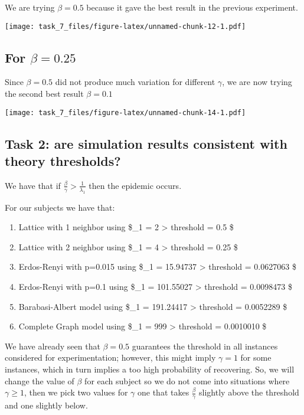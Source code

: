 \documentclass[]{article}
\providecommand{\tightlist}{%
  \setlength{\itemsep}{0pt}\setlength{\parskip}{0pt}}
\begin{document}
We are trying \(\beta = 0.5\) because it gave the best result in the
previous experiment.

\texttt{[image: task\_7\_files/figure-latex/unnamed-chunk-12-1.pdf]}

\subsection{\texorpdfstring{For
\(\beta = 0.25\)}{For \textbackslash{}beta = 0.25}}\label{for-beta-0.25}

Since \(\beta = 0.5\) did not produce much variation for different
\(\gamma\), we are now trying the second best result \(\beta = 0.1\)

\texttt{[image: task\_7\_files/figure-latex/unnamed-chunk-14-1.pdf]}

\subsection{Task 2: are simulation results consistent with theory
thresholds?}\label{task-2-are-simulation-results-consistent-with-theory-thresholds}

We have that if \(\frac{\beta}{\gamma} > \frac{1}{\lambda_1}\) then the
epidemic occurs.

For our subjects we have that:

\begin{enumerate}
\def\labelenumi{\arabic{enumi}.}
\tightlist
\item
  Lattice with 1 neighbor using \$\lambda\_1 = 2
  \implies \frac{\beta}{\gamma} \textgreater{} threshold = 0.5 \$
\item
  Lattice with 2 neighbor using \$\lambda\_1 = 4
  \implies \frac{\beta}{\gamma} \textgreater{} threshold = 0.25 \$
\item
  Erdos-Renyi with p=0.015 using \$\lambda\_1 = 15.94737
  \implies \frac{\beta}{\gamma} \textgreater{} threshold = 0.0627063 \$
\item
  Erdos-Renyi with p=0.1 using \$\lambda\_1 = 101.55027
  \implies \frac{\beta}{\gamma} \textgreater{} threshold = 0.0098473 \$
\item
  Barabasi-Albert model using \$\lambda\_1 = 191.24417
  \implies \frac{\beta}{\gamma} \textgreater{} threshold = 0.0052289 \$
\item
  Complete Graph model using \$\lambda\_1 = 999
  \implies \frac{\beta}{\gamma} \textgreater{} threshold = 0.0010010 \$
\end{enumerate}

We have already seen that \(\beta = 0.5\) guarantees the threshold in
all instances considered for experimentation; however, this might imply
\(\gamma = 1\) for some instances, which in turn implies a too high
probability of recovering. So, we will change the value of \(\beta\) for
each subject so we do not come into situations where \(\gamma \geq 1\),
then we pick two values for \(\gamma\) one that takes
\(\frac{\beta}{\gamma}\) slightly above the threshold and one slightly
below.
\end{document}
